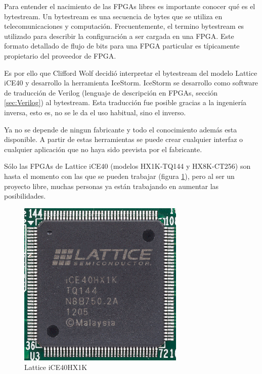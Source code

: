 Para entender el nacimiento de las FPGAs libres es importante conocer qué es el bytestream. \newline
Un bytestream es una secuencia de bytes que se utiliza en telecomunicaciones y computación. Frecuentemente, el termino bytestream es utilizado para describir la configuración a ser cargada en una FPGA. Este formato detallado de flujo de bits para una FPGA particular es típicamente propietario del proveedor de FPGA. \newline

Es por ello que Clifford Wolf decidió interpretar el bytestream del modelo Lattice iCE40 y desarrollo la herramienta IceStorm. \newline
IceStorm se desarrollo como software de traducción de Verilog (lenguaje de descripción en FPGAs, sección \ref{sec:Verilog}) al bytestream. Esta traducción fue posible gracias a la ingeniería inversa, esto es, no se le da el uso habitual, sino el inverso. 

Ya no se depende de ningun fabricante y todo el conocimiento además esta disponible. A partir de estas herramientas se puede crear cualquier interfaz o cualquier aplicación que no haya sido prevista por el fabricante. \newline

Sólo las FPGAs de Lattice iCE40 (modelos HX1K-TQ144 y HX8K-CT256) son hasta el momento con las que se pueden trabajar (figura \ref{fig:lattice}), pero al ser un proyecto libre, muchas personas ya están trabajando en aumentar las posibilidades.
\begin{center}
	\begin{figure}[H]
		\center
		\includegraphics[trim = 0mm 0mm 0mm 0mm, clip,scale=0.5]{imagenes/EstadoArte/lattice.png}
		\caption{Lattice iCE40HX1K}
		\label{fig:lattice}
	\end{figure}
\end{center}

